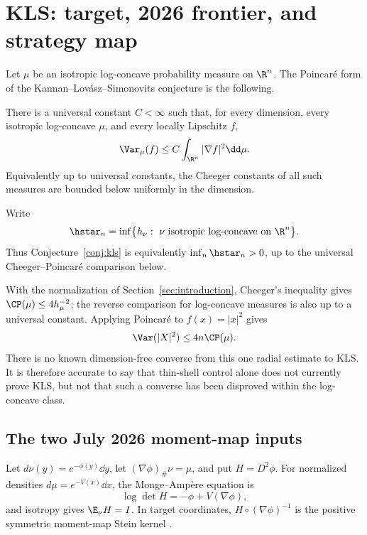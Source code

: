 \documentclass[../../main.tex]{subfiles}
\begin{document}
\section{KLS: target, 2026 frontier, and strategy map}
\label{sec:kls-strategy-map}

Let $\mu$ be an isotropic log-concave probability measure on $\R^n$. The Poincar\'e form of the
Kannan--Lov\'asz--Simonovits conjecture is the following.

\begin{conjecture}[KLS]
\label{conj:kls}
There is a universal constant $C<\infty$ such that, for every dimension, every isotropic
log-concave $\mu$, and every locally Lipschitz $f$,
\[
  \Var_\mu(f)\le C\int_{\R^n}|\nabla f|^2\dd\mu.
\]
Equivalently up to universal constants, the Cheeger constants of all such measures are bounded
below uniformly in the dimension.
\end{conjecture}

Write
\begin{equation}
  \hstar_n=\inf\bigl\{h_\nu:\ \nu\ \text{isotropic log-concave on }\R^n\bigr\}.
  \label{eq:hstar-def}
\end{equation}
Thus Conjecture~\ref{conj:kls} is equivalently $\inf_n\hstar_n>0$, up to the universal
Cheeger--Poincar\'e comparison below.

With the normalization of Section~\ref{sec:introduction}, Cheeger's inequality gives
$\CP(\mu)\le4h_\mu^{-2}$; the reverse comparison for log-concave measures is also up to a
universal constant. Applying Poincar\'e to $f(x)=|x|^2$ gives
\begin{equation}
  \Var(|X|^2)\le4n\CP(\mu).
  \label{eq:kls-implies-thin-shell}
\end{equation}
There is no known dimension-free converse from this one radial estimate to KLS. It is therefore
accurate to say that thin-shell control alone does not currently prove KLS, but not that such a
converse has been disproved within the log-concave class.

\subsection{The two July 2026 moment-map inputs}

Let $d\nu(y)=e^{-\phi(y)}\dd y$, let $(\nabla\phi)_\#\nu=\mu$, and put
$H=D^2\phi$. For normalized densities $d\mu=e^{-V(x)}\dd x$, the Monge--Amp\`ere equation is
\[
  \log\det H=-\phi+V(\nabla\phi),
\]
and isotropy gives $\E_\nu H=I$. In target coordinates,
$H\circ(\nabla\phi)^{-1}$ is the positive symmetric moment-map Stein kernel
\cite{Fathi2019SteinMomentMaps}.
\end{document}
